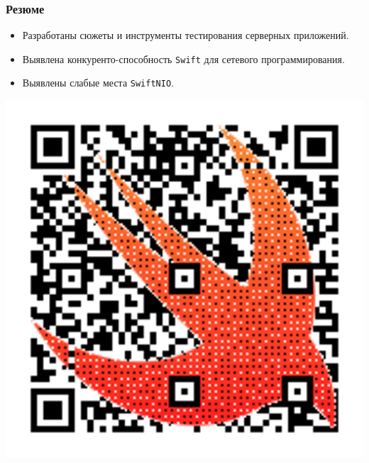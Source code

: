 \documentclass[10pt,xcolor={table,dvipsnames},t]{beamer}
\begin{document}
\begin{frame}
\frametitle{Резюме}
\begin{itemize}
  \item Разработаны сюжеты и инструменты тестирования серверных приложений.
  \item Выявлена конкуренто-способность \texttt{Swift} для сетевого программирования.
  \item Выявлены слабые места \texttt{SwiftNIO}. 
\end{itemize}
\vspace{0.6cm}
\includegraphics[scale=0.14,right]{swift_logo_qrcode.png}


\end{frame}
\end{document}
